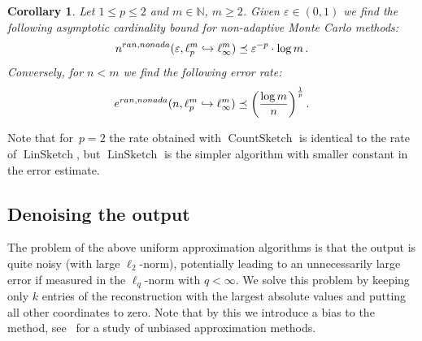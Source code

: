 \documentclass[12pt]{article}
\theoremstyle{plain}
\newtheorem{corollary}[theorem]{Corollary}
\theoremstyle{definition}
\newcommand{\ran}{\textup{ran}}
\newcommand{\nonada}{\textup{nonada}}
\newcommand{\eps}{\varepsilon}
\newcommand{\embed}{\hookrightarrow}
\newcommand{\N}{{\mathbb N}}
\DeclareMathOperator{\linsketch}{LinSketch}
\DeclareMathOperator{\countsketch}{CountSketch}
\begin{document}
\begin{corollary}\label{cor:countsketcherror}
    Let $1 \leq p \leq 2$ and $m \in \N$, $m \geq 2$.
    Given $\eps \in (0,1)$ we find the following asymptotic cardinality bound for non-adaptive Monte Carlo methods:
    \begin{equation*}
        n^{\ran,\nonada}(\eps,\ell_p^m \embed \ell_\infty^m)
            \preceq \eps^{-p} \cdot \log m \,.
    \end{equation*}
    Conversely, for $n < m$ we find the following error rate:
    \begin{equation*}
        e^{\ran,\nonada}(n,\ell_p^m \embed \ell_\infty^m)
            \preceq \left(\frac{\log m}{n} \right)^{\frac{1}{p}} .
    \end{equation*}
\end{corollary}

Note that for~$p=2$ the rate obtained with $\countsketch$ is identical to the rate of $\linsketch$, but $\linsketch$ is the simpler algorithm with smaller constant in the error estimate.


\subsection{Denoising the output}
\label{sec:denoise}

The problem of the above uniform approximation algorithms is
that the output is quite noisy (with large $\ell_2$-norm),
potentially leading to an unnecessarily large error
if measured in the $\ell_q$-norm with $q< \infty$.
We solve this problem by keeping only $k$ entries of the reconstruction with the largest absolute values and putting all other coordinates to zero.
Note that by this we introduce a bias to the method,
see~\cite{Ma96} for a study of unbiased approximation methods.
\end{document}
